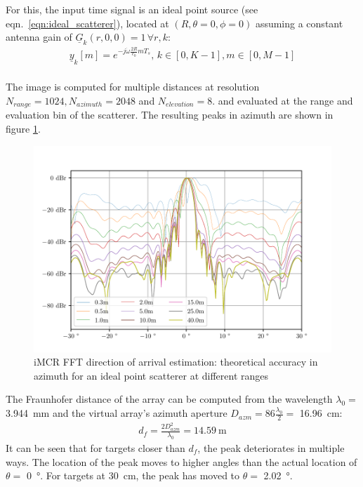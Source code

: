 For this, the input time signal is an ideal point source (see eqn.\ \ref{eqn:ideal_scatterer}),
located at $(R,\theta=0,\phi=0)$
assuming a constant antenna gain of $\underline G_k(r,0,0)=1 \,\forall r,k$:
\begin{align}
    \underline y_k[m] =  e^{-j\dot \omega \frac{2R}{c_0} m T_s}
    ,\,k\in[0,K-1],m\in[0,M-1]
\end{align}
\\
The image is computed for multiple distances at resolution
$N_{range} = 1024, N_{azimuth} = 2048$ and $N_{elevation} = 8$.
and evaluated at the range and evaluation bin of the scatterer.
The resulting peaks in azimuth are shown in figure \ref{fig:fft_azm_peak}.
\begin{figure}[h]
    \centering
    \includegraphics[width=\textwidth]{../figures/fft_azm_peak.pdf}
    \caption{iMCR FFT direction of arrival estimation: theoretical accuracy in azimuth for an ideal point scatterer at different ranges}
    \label{fig:fft_azm_peak}
\end{figure}

The Fraunhofer distance of the array can be computed from the wavelength $\lambda_0=$ \SIlist{3.944}{\mm}
and the virtual array's azimuth aperture $D_{azm} = 86 \frac{\lambda_0}{2}=$ \SI{16.96}{\cm}:
\begin{align}
    d_f  = \frac{2D_{azm}^2}{\lambda_0}
    = \SI{14.59}{\m}
\end{align}
It can be seen that for targets closer than $d_f$, the peak deteriorates in multiple ways.
The location of the peak moves to higher angles than the actual location of $\theta =$ \SI{0}{\degree}.
For targets at \SI{30}{\cm}, the peak has moved to $\theta =$ \SI{2.02}{\degree}.

